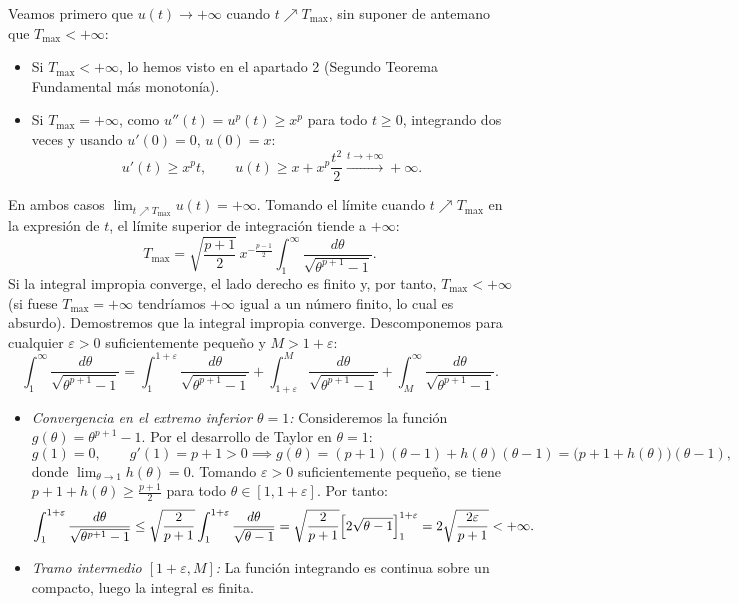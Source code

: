{    Veamos primero que $u(t) \to +\infty$ cuando $t \nearrow T_{\max}$, sin suponer de antemano que $T_{\max} < +\infty$:
    \begin{itemize}
        \item Si $T_{\max} < +\infty$, lo hemos visto en el apartado 2 (Segundo Teorema Fundamental más monotonía).
        \item Si $T_{\max} = +\infty$, como $u''(t) = u^p(t) \ge x^p$ para todo $t \ge 0$, integrando dos veces y usando $u'(0) = 0$, $u(0) = x$:
        \[
            u'(t) \ge x^p t, \qquad u(t) \ge x + x^p \frac{t^2}{2} \xrightarrow{t \to +\infty} +\infty.
        \]
    \end{itemize}
    En ambos casos $\lim_{t \nearrow T_{\max}} u(t) = +\infty$. Tomando el límite cuando $t \nearrow T_{\max}$ en la expresión de $t$, el límite superior de integración tiende a $+\infty$:
    \[
        T_{\max} = \sqrt{\frac{p+1}{2}} \, x^{-\frac{p-1}{2}} \int_1^\infty \frac{d\theta}{\sqrt{\theta^{p+1} - 1}}.
    \]
    Si la integral impropia converge, el lado derecho es finito y, por tanto, $T_{\max} < +\infty$ (si fuese $T_{\max} = +\infty$ tendríamos $+\infty$ igual a un número finito, lo cual es absurdo). Demostremos que la integral impropia converge. Descomponemos para cualquier $\varepsilon > 0$ suficientemente pequeño y $M > 1 + \varepsilon$:
    \[
        \int_1^\infty \frac{d\theta}{\sqrt{\theta^{p+1} - 1}} = \int_1^{1+\varepsilon} \frac{d\theta}{\sqrt{\theta^{p+1} - 1}} + \int_{1+\varepsilon}^M \frac{d\theta}{\sqrt{\theta^{p+1} - 1}} + \int_M^\infty \frac{d\theta}{\sqrt{\theta^{p+1} - 1}}.
    \]
    \begin{itemize}
        \item \textit{Convergencia en el extremo inferior $\theta = 1$:} Consideremos la función $g(\theta) = \theta^{p+1} - 1$. Por el desarrollo de Taylor en $\theta = 1$:
        \[
            g(1) = 0, \qquad g'(1) = p + 1 > 0 \implies g(\theta) = (p + 1)(\theta - 1) + h(\theta)(\theta - 1) = \bigl( p + 1 + h(\theta) \bigr)(\theta - 1),
        \]
        donde $\lim_{\theta \to 1} h(\theta) = 0$. Tomando $\varepsilon > 0$ suficientemente pequeño, se tiene $p + 1 + h(\theta) \ge \frac{p+1}{2}$ para todo $\theta \in [1, 1+\varepsilon]$. Por tanto:
        \[
            \int_1^{1+\varepsilon} \frac{d\theta}{\sqrt{\theta^{p+1} - 1}} \le \sqrt{\frac{2}{p+1}} \int_1^{1+\varepsilon} \frac{d\theta}{\sqrt{\theta - 1}} = \sqrt{\frac{2}{p+1}} \Bigl[ 2\sqrt{\theta - 1} \Bigr]_1^{1+\varepsilon} = 2 \sqrt{\frac{2\varepsilon}{p+1}} < +\infty.
        \]
        \item \textit{Tramo intermedio $[1+\varepsilon, M]$:} La función integrando es continua sobre un compacto, luego la integral es finita.

\end{itemize}}
